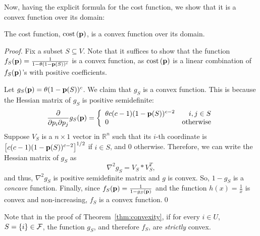 Now, having the explicit formula for the cost function, we show that it is a convex function over its domain:
\begin{theorem}\label{thm:convexity}
 The cost function, $\text{cost}\left( \mathbf{p} \right)$, is a convex function over its domain.
\end{theorem}
\begin{proof}
 Fix a subset $S\subseteq V$. Note that it suffices to show that the function $f_S(\mathbf{p}) = \frac{1}{1 - \theta(1-\mathbf{p}(S))^c}$ is a convex function, as $\text{cost}\left( \mathbf{p} \right)$ is a linear combination of $f_S(\mathbf{p})$'s with positive coefficients. 
 
 Let $g_S(\mathbf{p}) = \theta(1-\mathbf{p}(S))^c$. We claim that $g_S$ is a convex function. This is because the Hessian matrix of $g_S$ is positive semidefinite:
 $$
    \frac{\partial}{\partial p_i \partial p_j} g_S(\mathbf{p}) = \left\{
     \begin{array}{lr}
       \theta c(c-1) (1-\mathbf{p}(S))^{c-2} &  i,j \in S\\
       0 &  \text{otherwise}
     \end{array}
   \right.
 $$
 Suppose $V_S$ is a $n\times 1$ vector in $\mathbb{R}^n$ such that its $i$-th coordinate is $\left[c(c-1) (1-\mathbf{p}(S))^{c-2} \right]^{1/2}$ if $i\in S$, and 0 otherwise. Therefore, we can write the Hessian matrix of $g_S$ as
 $$\nabla^2 g_S = V_S * V_S^T,$$ 
 and thus, $\nabla^2 g_S$ is positive semidefinite matrix and $g$ is convex. So, $1-g_S$ is a \emph{concave} function. Finally, since $f_S(\mathbf{p})=\frac{1}{1-g_S(\mathbf{p})}$ and the function $h(x)=\frac{1}{x}$ is convex and non-increasing, $f_S$ is a convex function.\qed
%  
%  
%  
%  
\end{proof}
Note that in the proof of Theorem~\ref{thm:convexity}, if for every $i\in U$, $S=\left\{i\right\}\in \mathcal{F}$, the function $g_S$, and therefore $f_S$, are \emph{strictly} convex.


